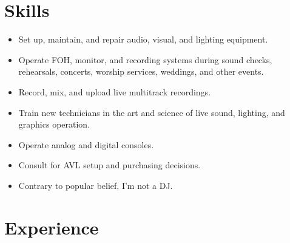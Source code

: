 \documentclass[12pt,sans,colorlinks,linkcolor=true]{moderncv}        %
\begin{document}

\section{Skills}

\begin{itemize}
\item Set up, maintain, and repair audio, visual, and lighting equipment.
\item Operate FOH, monitor, and recording systems during sound checks, rehearsals, concerts, worship services, weddings, and other events.
\item Record, mix, and upload live multitrack recordings.
\item Train new technicians in the art and science of live sound, lighting, and graphics operation.
\item Operate analog and digital consoles.
\item Consult for AVL setup and purchasing decisions.
\item Contrary to popular belief, I'm not a DJ.
\end{itemize}


\section{Experience}


\end{document}
